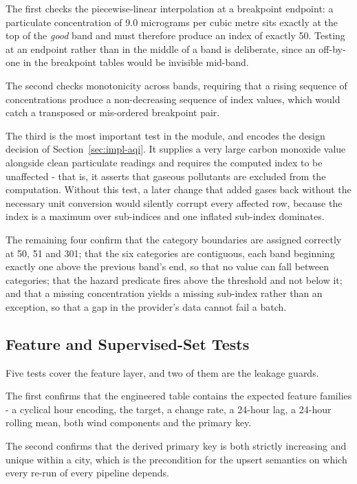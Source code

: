The first checks the piecewise-linear interpolation at a breakpoint endpoint: a
particulate concentration of 9.0 micrograms per cubic metre sits exactly at the
top of the \emph{good} band and must therefore produce an index of exactly 50.
Testing at an endpoint rather than in the middle of a band is deliberate, since
an off-by-one in the breakpoint tables would be invisible mid-band.

The second checks monotonicity across bands, requiring that a rising sequence of
concentrations produce a non-decreasing sequence of index values, which would
catch a transposed or mis-ordered breakpoint pair.

The third is the most important test in the module, and encodes the design
decision of Section~\ref{sec:impl-aqi}. It supplies a very large carbon monoxide
value alongside clean particulate readings and requires the computed index to be
unaffected - that is, it asserts that gaseous pollutants are excluded from the
computation. Without this test, a later change that added gases back without the
necessary unit conversion would silently corrupt every affected row, because the
index is a maximum over sub-indices and one inflated sub-index dominates.

The remaining four confirm that the category boundaries are assigned correctly at
50, 51 and 301; that the six categories are contiguous, each band beginning
exactly one above the previous band's end, so that no value can fall between
categories; that the hazard predicate fires above the threshold and not below it;
and that a missing concentration yields a missing sub-index rather than an
exception, so that a gap in the provider's data cannot fail a batch.

\subsection{Feature and Supervised-Set Tests}
Five tests cover the feature layer, and two of them are the leakage guards.

The first confirms that the engineered table contains the expected feature
families - a cyclical hour encoding, the target, a change rate, a 24-hour lag, a
24-hour rolling mean, both wind components and the primary key.

The second confirms that the derived primary key is both strictly increasing and
unique within a city, which is the precondition for the upsert semantics on which
every re-run of every pipeline depends.


